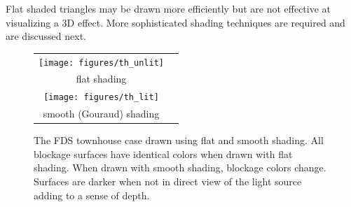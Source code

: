 \documentclass[11pt,twoside]{book}
\begin{document}
Flat shaded triangles may be drawn more efficiently but are not
effective at visualizing a 3D effect.  More sophisticated shading
techniques are required and are discussed next.

\begin{figure}[t]
\begin{center}
\begin{tabular}{cc}
\texttt{[image: figures/th\_unlit]}\\
flat shading\\
\texttt{[image: figures/th\_lit]}\\
smooth (Gouraud) shading\\
\end{tabular}
\end{center}
\caption [The FDS townhouse case drawn using flat and smooth
shading.] { The FDS townhouse case drawn using flat and smooth
shading. All blockage surfaces have identical colors when drawn
with flat shading.  When drawn with smooth shading, blockage
colors change.  Surfaces are darker when not in direct view of the
light source adding to a sense of depth. } \label{figlighting}
\end{figure}
\end{document}
